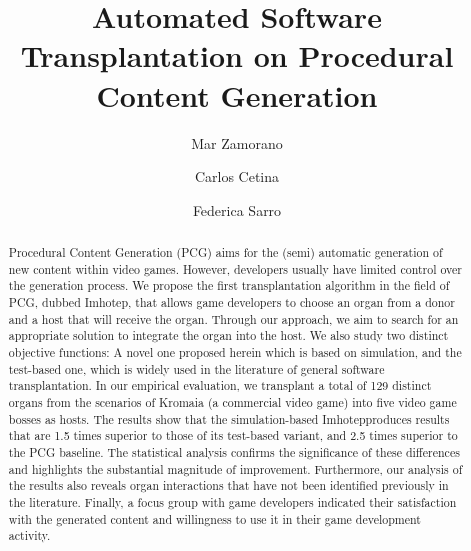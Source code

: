 \documentclass[sigconf,screen,review]{acmart}
\newcommand{\ApproachName}{{\sc Imhotep}}
\newcommand{\CaseStudy}{Kromaia}
\begin{document}
\title{Automated Software Transplantation on Procedural Content Generation}

\author{Mar Zamorano}

\author{Carlos Cetina}

\author{Federica Sarro}

\renewcommand{\shortauthors}{Zamorano et al.}

\begin{abstract}
Procedural Content Generation (PCG) aims for the (semi) automatic generation of new content within video games. However, developers usually have limited control over the generation process.
We propose the first transplantation algorithm in the field of PCG, dubbed \ApproachName, that allows game developers to choose an organ from a donor and a host that will receive the organ. 
Through our approach, we aim to search for an appropriate solution to integrate the organ into the host. 
We also study two distinct objective functions: A novel one proposed herein which is based on simulation, and the test-based one, which is widely used in the literature of general software transplantation.
In our empirical evaluation, we transplant a total of 129 distinct organs from the scenarios of \CaseStudy{} (a commercial video game) into five video game bosses as hosts.
The results show that the simulation-based \ApproachName produces results that are 1.5 times superior to those of its test-based variant, and 2.5 times superior to the PCG baseline. 
The statistical analysis confirms the significance of these differences and highlights the substantial magnitude of improvement. 
Furthermore, our analysis of the results also reveals organ interactions that have not been  identified previously in the literature.
Finally, a focus group with game developers indicated their satisfaction with the generated content and willingness to use it in their game development activity.
\end{abstract}
\end{document}
